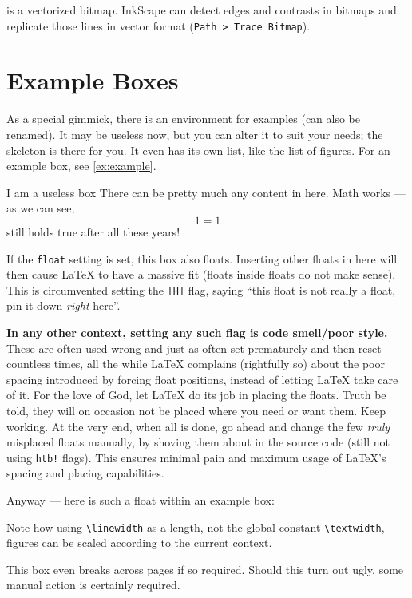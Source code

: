  is a vectorized bitmap.
InkScape can detect edges and contrasts in bitmaps and replicate those lines in
vector format (\texttt{Path > Trace Bitmap}).

\section{Example Boxes}

As a special gimmick, there is an environment for examples (can also be renamed).
It may be useless now, but you can alter it to suit your needs; the skeleton is
there for you.
It even has its own list, like the list of figures.
For an example box, see \cref{ex:example}.

\begin{example}[%
        label={ex:example},%
    ]{%
        I am a useless box%
    }
    There can be pretty much any content in here.
    Math works --- as we can see,
    \begin{equation}
        1 = 1
    \end{equation}
    still holds true after all these years!
    
    If the \verb|float| setting is set, this box also floats.
    Inserting other floats in here will then cause \LaTeX{} to have a massive fit
    (floats inside floats do not make sense).
    This is circumvented setting the \verb|[H]| flag,
    saying \enquote{this float is not really a float, pin it down \emph{right} here}.
    
    \textbf{In any other context, setting any such flag is code smell/poor style.}
    These are often used wrong and just as often set prematurely and then reset
    countless times, all the while \LaTeX{} complains (rightfully so) about the poor
    spacing introduced by forcing float positions, instead of letting \LaTeX{} take
    care of it.
    For the love of God, let \LaTeX{} do its job in placing the floats.
    Truth be told, they will on occasion not be placed where you need or want them.
    Keep working.
    At the very end, when all is done, go ahead and change the few \emph{truly}
    misplaced floats manually, by shoving them about in the source code
    (still not using \verb|htb!| flags).
    This ensures minimal pain and maximum usage of \LaTeX{}'s spacing and placing
    capabilities.
    
    Anyway --- here is such a float within an example box:
    \begin{center}
    \end{center}
    Note how using \verb|\linewidth| as a length, not the global constant
    \verb|\textwidth|, figures can be scaled according to the current context.
    
    This box even breaks across pages if so required.
    Should this turn out ugly, some manual action is certainly required.
\end{example}
